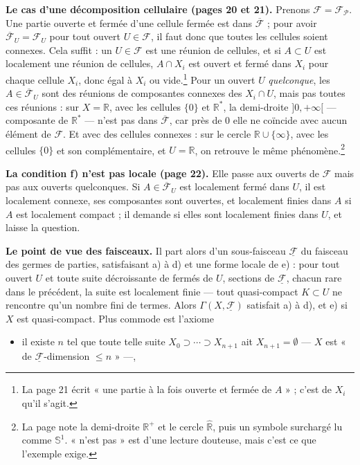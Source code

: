 \documentclass[11pt,a4paper]{article}
\begin{document}
\textbf{Le cas d'une décomposition cellulaire (pages 20 et 21).} Prenons
$\mathcal{F} = \mathcal{F}_{\mathcal{P}}$. Une partie ouverte et fermée d'une
cellule fermée est dans $\overline{\mathcal{F}}$ ; pour avoir
$\overline{\mathcal{F}}_U = \mathcal{F}_U$ pour tout ouvert $U \in \mathcal{F}$,
il faut donc que toutes les cellules soient connexes. Cela suffit : un $U \in
\mathcal{F}$ est une réunion de cellules, et si $A \subset U$ est localement une
réunion de cellules, $A \cap X_i$ est ouvert et fermé dans $X_i$ pour chaque
cellule $X_i$, donc égal à $X_i$ ou vide.\footnote{La page 21 écrit « une
partie à la fois ouverte et fermée de $A$ » ; c'est de $X_i$ qu'il s'agit.}
Pour un ouvert $U$ \emph{quelconque}, les $A \in \overline{\mathcal{F}}_U$ sont
des réunions de composantes connexes des $X_i \cap U$, mais pas toutes ces
réunions : sur $X = \mathbb{R}$, avec les cellules $\{0\}$ et $\mathbb{R}^{*}$,
la demi-droite $]0, +\infty[$ — composante de $\mathbb{R}^{*}$ — n'est pas dans
$\overline{\mathcal{F}}$, car près de $0$ elle ne coïncide avec aucun élément
de $\mathcal{F}$. Et avec des cellules connexes : sur le cercle
$\mathbb{R} \cup \{\infty\}$, avec les cellules $\{0\}$ et son complémentaire,
et $U = \mathbb{R}$, on retrouve le même phénomène.\footnote{La page note la
demi-droite $\mathbb{R}^{+}$ et le cercle $\widehat{\mathbb{R}}$, puis un
symbole surchargé lu comme $\mathbb{S}^1$. « n'est pas » est d'une lecture
douteuse, mais c'est ce que l'exemple exige.}

\textbf{La condition f) n'est pas locale (page 22).} Elle passe aux ouverts de
$\mathcal{F}$ mais pas aux ouverts quelconques. Si $A \in
\overline{\mathcal{F}}_U$ est localement fermé dans $U$, il est localement
connexe, ses composantes sont ouvertes, et localement finies dans $A$ si $A$
est localement compact ; il demande si elles sont localement finies dans $U$,
et laisse la question.

\textbf{Le point de vue des faisceaux.} Il part alors d'un sous-faisceau
$\underline{\mathcal{F}}$ du faisceau des germes de parties, satisfaisant a) à
d) et une forme locale de e) : pour tout ouvert $U$ et toute suite décroissante
de fermés de $U$, sections de $\underline{\mathcal{F}}$, chacun rare dans le
précédent, la suite est localement finie — tout quasi-compact $K \subset U$ ne
rencontre qu'un nombre fini de termes. Alors $\Gamma(X, \underline{\mathcal{F}})$
satisfait a) à d), et e) si $X$ est quasi-compact. Plus commode est l'axiome

\begin{itemize}
\item[e$_n$)] il existe $n$ tel que toute telle suite $X_0 \supset \cdots
  \supset X_{n+1}$ ait $X_{n+1} = \emptyset$ — $X$ est « de
  $\underline{\mathcal{F}}$-dimension $\leqslant n$ » —,
\end{itemize}
\end{document}
